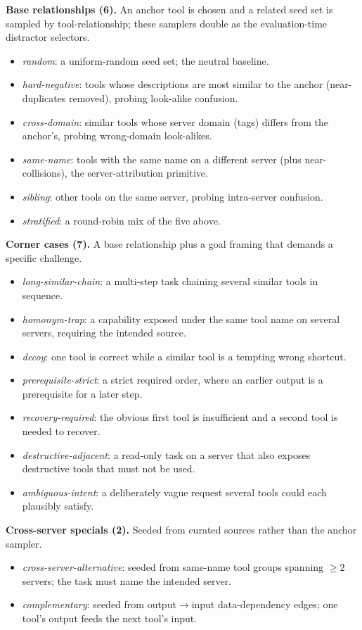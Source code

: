\noindent\textbf{Base relationships (6).} An anchor tool is chosen and a
related seed set is sampled by tool-relationship; these samplers double as the
evaluation-time distractor selectors.
\begin{itemize}
  \item \emph{random}: a uniform-random seed set; the neutral baseline.
  \item \emph{hard-negative}: tools whose descriptions are most similar to the
    anchor (near-duplicates removed), probing look-alike confusion.
  \item \emph{cross-domain}: similar tools whose server domain (tags) differs
    from the anchor's, probing wrong-domain look-alikes.
  \item \emph{same-name}: tools with the same name on a different server
    (plus near-collisions), the server-attribution primitive.
  \item \emph{sibling}: other tools on the same server, probing
    intra-server confusion.
  \item \emph{stratified}: a round-robin mix of the five above.
\end{itemize}
\noindent\textbf{Corner cases (7).} A base relationship plus a goal framing
that demands a specific challenge.
\begin{itemize}
  \item \emph{long-similar-chain}: a multi-step task chaining several similar
    tools in sequence.
  \item \emph{homonym-trap}: a capability exposed under the same tool name on
    several servers, requiring the intended source.
  \item \emph{decoy}: one tool is correct while a similar tool is a tempting
    wrong shortcut.
  \item \emph{prerequisite-strict}: a strict required order, where an earlier
    output is a prerequisite for a later step.
  \item \emph{recovery-required}: the obvious first tool is insufficient and a
    second tool is needed to recover.
  \item \emph{destructive-adjacent}: a read-only task on a server that also
    exposes destructive tools that must not be used.
  \item \emph{ambiguous-intent}: a deliberately vague request several tools
    could each plausibly satisfy.
\end{itemize}
\noindent\textbf{Cross-server specials (2).} Seeded from curated sources
rather than the anchor sampler.
\begin{itemize}
  \item \emph{cross-server-alternative}: seeded from same-name tool groups
    spanning $\geq 2$ servers; the task must name the intended server.
  \item \emph{complementary}: seeded from output$\rightarrow$input
    data-dependency edges; one tool's output feeds the next tool's input.
\end{itemize}

